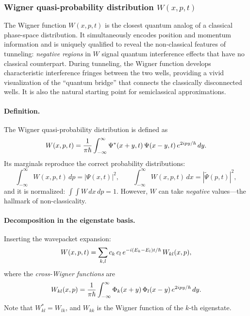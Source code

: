 \subsubsection{Wigner quasi-probability distribution $W(x,p,t)$}\label{sec:wigner}

\begin{remark}
The Wigner function $W(x,p,t)$ is the closest quantum analog of a classical phase-space distribution.
It simultaneously encodes position and momentum information and is uniquely qualified to reveal the non-classical features of tunneling: \emph{negative regions} in $W$ signal quantum interference effects that have no classical counterpart.
During tunneling, the Wigner function develops characteristic interference fringes between the two wells, providing a vivid visualization of the ``quantum bridge'' that connects the classically disconnected wells.
It is also the natural starting point for semiclassical approximations.
\end{remark}

\paragraph{Definition.}

The Wigner quasi-probability distribution is defined as
\begin{equation}\label{eq:wigner_def}
  W(x,p,t) = \frac{1}{\pi\hbar}\int_{-\infty}^{\infty} \Psi^*(x+y,t)\,\Psi(x-y,t)\,e^{2ipy/\hbar}\,dy.
\end{equation}
Its marginals reproduce the correct probability distributions:
\begin{equation}
  \int_{-\infty}^{\infty} W(x,p,t)\,dp = |\Psi(x,t)|^2, \qquad
  \int_{-\infty}^{\infty} W(x,p,t)\,dx = |\tilde{\Psi}(p,t)|^2,
\end{equation}
and it is normalized: $\int\!\!\int W\,dx\,dp = 1$.
However, $W$ can take \emph{negative} values---the hallmark of non-classicality.

\paragraph{Decomposition in the eigenstate basis.}

Inserting the wavepacket expansion:
\begin{equation}\label{eq:wigner_expansion}
  W(x,p,t) = \sum_{k,l} c_k\,c_l\,e^{-i(E_k - E_l)t/\hbar}\,W_{kl}(x,p),
\end{equation}
where the \emph{cross-Wigner functions} are
\begin{equation}\label{eq:cross_wigner}
  W_{kl}(x,p) = \frac{1}{\pi\hbar}\int_{-\infty}^{\infty} \Phi_k(x+y)\,\Phi_l(x-y)\,e^{2ipy/\hbar}\,dy.
\end{equation}
Note that $W_{kl}^* = W_{lk}$, and $W_{kk}$ is the Wigner function of the $k$-th eigenstate.

